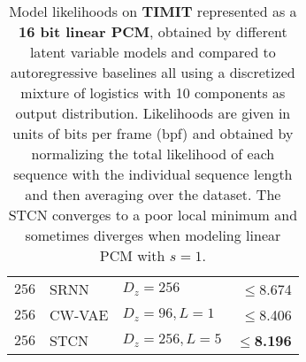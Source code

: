\begin{table}[t!]
\begin{tabular}{lll|r}
        $256$      & SRNN                & $D_z=256$             & $\leq$8.674 \\
        $256$      & CW-VAE              & $D_z=96, L=1$         & $\leq$8.406 \\
        $256$      & STCN                & $D_z=256,L=5$         & $\leq$\textbf{8.196} \\
        \bottomrule
    \end{tabular}
    \caption{
    Model likelihoods on \textbf{TIMIT} represented as a \textbf{16 bit linear PCM}, obtained by different latent variable models and compared to autoregressive baselines all using a discretized mixture of logistics with 10 components as output distribution. Likelihoods are given in units of bits per frame (bpf) and obtained by normalizing the total likelihood of each sequence with the individual sequence length and then averaging over the dataset. The STCN converges to a poor local minimum and sometimes diverges when modeling linear PCM with $s=1$.
    }
    \label{tab: timit likelihoods dmol linear appendix}
\end{table}


